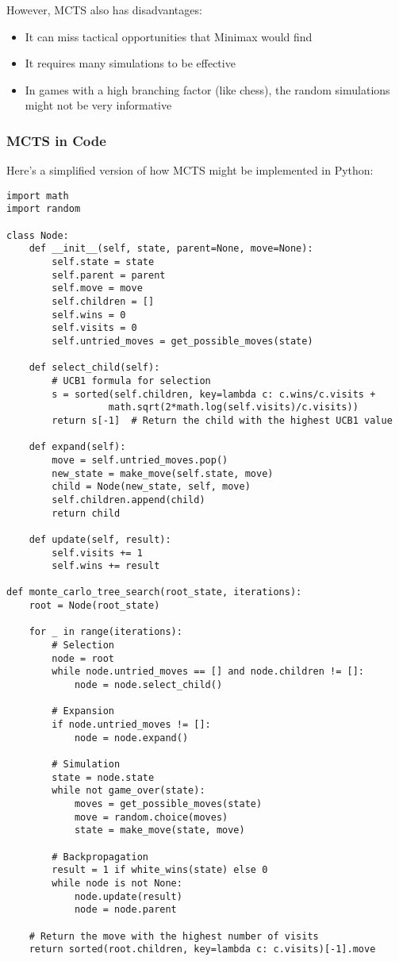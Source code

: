 \documentclass[11pt]{article}
\begin{document}
However, MCTS also has disadvantages:
\begin{itemize}
    \item It can miss tactical opportunities that Minimax would find
    \item It requires many simulations to be effective
    \item In games with a high branching factor (like chess), the random simulations might not be very informative
\end{itemize}

\subsubsection{MCTS in Code}

Here's a simplified version of how MCTS might be implemented in Python:

\begin{lstlisting}[style=Python]
import math
import random

class Node:
    def __init__(self, state, parent=None, move=None):
        self.state = state
        self.parent = parent
        self.move = move
        self.children = []
        self.wins = 0
        self.visits = 0
        self.untried_moves = get_possible_moves(state)

    def select_child(self):
        # UCB1 formula for selection
        s = sorted(self.children, key=lambda c: c.wins/c.visits +
                  math.sqrt(2*math.log(self.visits)/c.visits))
        return s[-1]  # Return the child with the highest UCB1 value

    def expand(self):
        move = self.untried_moves.pop()
        new_state = make_move(self.state, move)
        child = Node(new_state, self, move)
        self.children.append(child)
        return child

    def update(self, result):
        self.visits += 1
        self.wins += result

def monte_carlo_tree_search(root_state, iterations):
    root = Node(root_state)

    for _ in range(iterations):
        # Selection
        node = root
        while node.untried_moves == [] and node.children != []:
            node = node.select_child()

        # Expansion
        if node.untried_moves != []:
            node = node.expand()

        # Simulation
        state = node.state
        while not game_over(state):
            moves = get_possible_moves(state)
            move = random.choice(moves)
            state = make_move(state, move)

        # Backpropagation
        result = 1 if white_wins(state) else 0
        while node is not None:
            node.update(result)
            node = node.parent

    # Return the move with the highest number of visits
    return sorted(root.children, key=lambda c: c.visits)[-1].move
\end{lstlisting}
\end{document}
